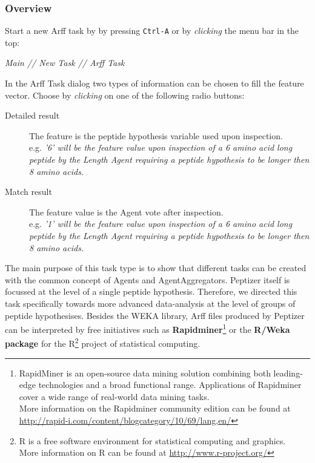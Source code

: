 \subsubsection{Overview}
\npar Start a new Arff task by by pressing \verb!Ctrl-A! or by \textit{clicking }the menu bar in the top:
%
\begin{center}
\textit{Main // New Task // Arff Task}	
\end{center}
\npar In the Arff Task dialog two types of information can be chosen to fill the feature vector. Choose by \textit{clicking} on one of the following radio buttons:
\begin{description}
	\item[Detailed result] The feature is the peptide hypothesis variable used upon inspection.\\e.g. \textit{'6' will be the feature value upon inspection of a 6 amino acid long peptide by the Length Agent requiring a peptide hypothesis to be longer then 8 amino acids.}
	\item[Match result] The feature value is the Agent vote after inspection.\\e.g. \textit{'1' will be the feature value upon inspection of a 6 amino acid long peptide by the Length Agent requiring a peptide hypothesis to be longer then 8 amino acids.}
\end{description}
%
\npar The main purpose of this task type is to show that different tasks can be created with the common concept of Agents and AgentAggregators. Peptizer itself is focussed at the level of a single peptide hypothesis. Therefore, we directed this task specifically towards more advanced data-analysis at the level of groups of peptide hypothesises.
\npar Besides the WEKA library, Arff files produced by Peptizer can be interpreted by free initiatives such as \textbf{Rapidminer}\footnote{RapidMiner is an open-source data mining solution combining both leading-edge technologies and a broad functional range. Applications of Rapidminer cover a wide range of real-world data mining tasks.\\More information on the Rapidminer community edition can be found at \\\url{http://rapid-i.com/content/blogcategory/10/69/lang,en/}} or the \textbf{R/Weka package} for the R\footnote{R is a free software environment for statistical computing and graphics.\\More information on R can be found at \url{http://www.r-project.org/}} project of statistical computing.


